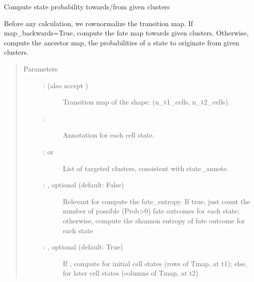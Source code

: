 \documentclass[letterpaper,10pt,english]{sphinxmanual}
\begin{document}
\begin{fulllineitems}
\label{\detokenize{cospar.hf.compute_state_potential:cospar.hf.compute_state_potential}}
Compute state probability towards/from given clusters

Before any calculation, we row\sphinxhyphen{}normalize the transition map.
If map\_backwards=True, compute the fate map towards given
clusters. Otherwise, compute the ancestor map, the probabilities
of a state to originate from given clusters.
\begin{quote}\begin{description}
\item[{Parameters}] \leavevmode\begin{description}
\item[{ :  (also accept )}] \leavevmode
Transition map of the shape: (n\_t1\_cells, n\_t2\_cells).

\item[{ : }] \leavevmode
Annotation for each cell state.

\item[{ :  or }] \leavevmode
List of targeted clusters, consistent with state\_annote.

\item[{ : , optional (default: False)}] \leavevmode
Relevant for compute the fate\_entropy. If true, just count
the number of possible (Prob\textgreater{}0) fate outcomes for each state;
otherwise, compute the shannon entropy of fate outcome for each state

\item[{ : , optional (default: True)}] \leavevmode
If , compute for initial cell states (rows of Tmap, at t1);
else, for later cell states (columns of Tmap, at t2)


\end{description}
\end{description}
\end{quote}
\end{fulllineitems}
\end{document}
